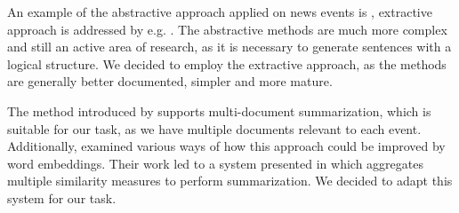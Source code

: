 An example of the abstractive approach applied on news events is \cite{heady}, extractive approach is addressed by e.g. \cite{sum-multi, multi-summarization-1, multi-summarization-2}. The abstractive methods are much more complex and still an active area of research, as it is necessary to generate sentences with a logical structure. We decided to employ the extractive approach, as the methods are generally better documented, simpler and more mature.

The method introduced by \cite{multi-summarization-1, multi-summarization-2} supports multi-document summarization, which is suitable for our task, as we have multiple documents relevant to each event. Additionally, \cite{mogren-1} examined various ways of how this approach could be improved by word embeddings. Their work led to a system presented in \cite{mogren-2} which aggregates multiple similarity measures to perform summarization. We decided to adapt this system for our task.